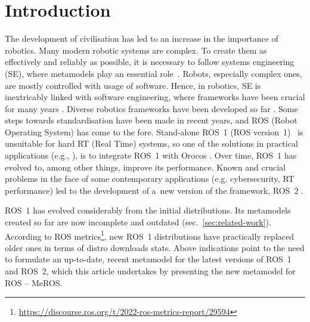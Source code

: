 \documentclass{ieeeaccess}
\begin{document}
	\titlepgskip=-15pt
	
	\maketitle
	
\section{Introduction}
\label{sec:intro}	
	The development of civilisation has led to an increase in the importance of robotics. Many modern robotic systems are complex. To create them as effectively and reliably as possible, it is necessary to follow systems engineering (SE), where metamodels play an essential role~\cite{bezivin2004search,schmidt2006model,kent2002model}.
	Robots, especially complex ones, are mostly controlled with usage of software. Hence, in robotics, SE is inextricably linked with software engineering, where frameworks have been crucial for many years \cite{mnkandla2009software,shehory2014agent}.
	Diverse robotics frameworks have been developed so far \cite{inigo2012robotics,tsardoulias2017robotic,hentout2016survey}. Some steps towards standardisation have been made in recent years, and ROS (Robot Operating System) has come to the fore. Stand-alone ROS~1 (ROS version~1)~\cite{quigley2009ros} is unsuitable for hard RT (Real Time) systems, so one of the solutions in practical applications (e.g., \cite{lages2014architecture,buys2011haptic,pages2016tiago,Seredynski-fabric-romoco-2019,kornuta-bpan-2020,cholewinski2015software}), is to integrate ROS~1 with Orocos \cite{bruyninckx2001open,bruyninckx2002orocos}. Over time, ROS~1 has evolved to, among other things, improve its performance. Known and crucial problems in the face of some contemporary applications (e.g. cybersecurity, RT performance) led to the development of a~new version of the framework, ROS~2 \cite{maruyama2016exploring,park2020real}.   

	ROS~1 has evolved considerably from the initial distributions. Its metamodels created so far are now incomplete and outdated (sec.~\ref{sec:related-work}). According to ROS metrics\footnote{\url{https://discourse.ros.org/t/2022-ros-metrics-report/29594}}, new ROS~1 distributions have practically replaced older ones in terms of distro downloads stats. Above indications point to the need to formulate an up-to-date, recent metamodel for the latest versions of ROS~1 and ROS~2, which this article undertakes by presenting the new metamodel for ROS -- MeROS.
	
\end{document}
